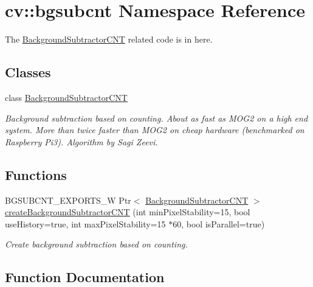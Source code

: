 \hypertarget{namespacecv_1_1bgsubcnt}{}\section{cv\+:\+:bgsubcnt Namespace Reference}
\label{namespacecv_1_1bgsubcnt}


The \hyperlink{classcv_1_1bgsubcnt_1_1BackgroundSubtractorCNT}{Background\+Subtractor\+C\+NT} related code is in here.  


\subsection*{Classes}
\begin{DoxyCompactItemize}
\item 
class \hyperlink{classcv_1_1bgsubcnt_1_1BackgroundSubtractorCNT}{Background\+Subtractor\+C\+NT}
\begin{DoxyCompactList}\small\item\em Background subtraction based on counting. About as fast as M\+O\+G2 on a high end system. More than twice faster than M\+O\+G2 on cheap hardware (benchmarked on Raspberry Pi3). Algorithm by Sagi Zeevi. \end{DoxyCompactList}\end{DoxyCompactItemize}
\subsection*{Functions}
\begin{DoxyCompactItemize}
\item 
B\+G\+S\+U\+B\+C\+N\+T\+\_\+\+E\+X\+P\+O\+R\+T\+S\+\_\+W Ptr$<$ \hyperlink{classcv_1_1bgsubcnt_1_1BackgroundSubtractorCNT}{Background\+Subtractor\+C\+NT} $>$ \hyperlink{namespacecv_1_1bgsubcnt_a6a6efd913954320be33f39c32a4c5a7e}{create\+Background\+Subtractor\+C\+NT} (int min\+Pixel\+Stability=15, bool use\+History=true, int max\+Pixel\+Stability=15 $\ast$60, bool is\+Parallel=true)
\begin{DoxyCompactList}\small\item\em Create background subtraction based on counting. \end{DoxyCompactList}\end{DoxyCompactItemize}


\subsection{Function Documentation}
